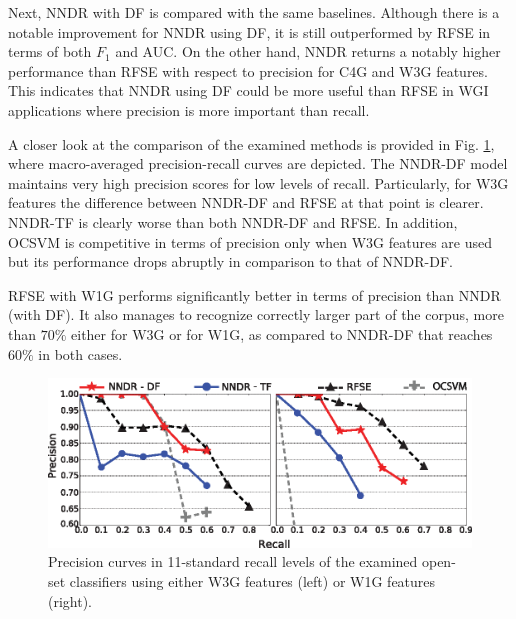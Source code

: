 Next, NNDR with DF is compared with the same baselines. Although there is a notable improvement for NNDR using DF, it is still outperformed by RFSE in terms of both $F_1$ and AUC. On the other hand, NNDR returns a notably higher performance than RFSE with respect to precision for C4G and W3G features. This indicates that NNDR using DF could be more useful than RFSE in WGI applications where precision is more important than recall.

A closer look at  the comparison of the examined methods is provided in Fig. \ref{chap:word_embeddings:fig:NNDR_W3G_Best_RFSE_Baseline}, where macro-averaged precision-recall curves are depicted. The NNDR-DF model maintains very high precision scores for low levels of recall. Particularly, for W3G features the difference between NNDR-DF and RFSE at that point is clearer. NNDR-TF is clearly worse than both NNDR-DF and RFSE. In addition, OCSVM is competitive in terms of precision only when W3G features are used but its performance drops abruptly in comparison to that of NNDR-DF. 

RFSE with W1G performs significantly better in terms of precision than NNDR (with DF). It also manages to recognize correctly larger part of the corpus, more than $70\%$ either for W3G or for W1G, as compared to NNDR-DF that reaches $60\%$ in both cases. 

\begin{figure}[t]
\begin{center}
    \includegraphics[scale=0.95]{Figures/NNDR_W3G-W1G_Best_RFSE-OCSVM-Baselines.eps}
	\caption{Precision curves in 11-standard recall levels of the examined open-set classifiers using either W3G features (left) or W1G features (right).}
	\label{chap:word_embeddings:fig:NNDR_W3G_Best_RFSE_Baseline}
	\end{center}
\end{figure}


